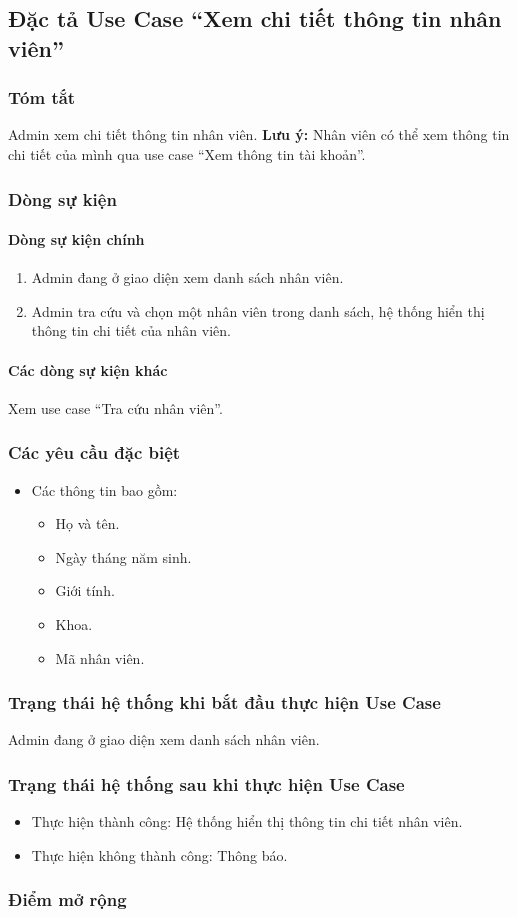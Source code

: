 \subsection{Đặc tả Use Case ``Xem chi tiết thông tin nhân viên''}

\subsubsection{Tóm tắt}
Admin xem chi tiết thông tin nhân viên.
\textbf{Lưu ý:} Nhân viên có thể xem thông tin chi tiết của mình qua use case ``Xem thông tin tài khoản''.

\subsubsection{Dòng sự kiện}
\paragraph{\textbf{Dòng sự kiện chính}}
\begin{enumerate}
  \item Admin đang ở giao diện xem danh sách nhân viên.
  \item Admin tra cứu và chọn một nhân viên trong danh sách, hệ thống hiển thị thông tin chi tiết của nhân viên.
\end{enumerate}

\paragraph{\textbf{Các dòng sự kiện khác}}
Xem use case ``Tra cứu nhân viên''.

\subsubsection{Các yêu cầu đặc biệt}
\begin{itemize}
  \item Các thông tin bao gồm:
    \begin{itemize}
      \item Họ và tên.
      \item Ngày tháng năm sinh.
      \item Giới tính.
      \item Khoa.
      \item Mã nhân viên.
    \end{itemize}
\end{itemize}

\subsubsection{Trạng thái hệ thống khi bắt đầu thực hiện Use Case}
Admin đang ở giao diện xem danh sách nhân viên.

\subsubsection{Trạng thái hệ thống sau khi thực hiện Use Case}
\begin{itemize}
  \item Thực hiện thành công: Hệ thống hiển thị thông tin chi tiết nhân viên.
  \item Thực hiện không thành công: Thông báo.
\end{itemize}

\subsubsection{Điểm mở rộng}